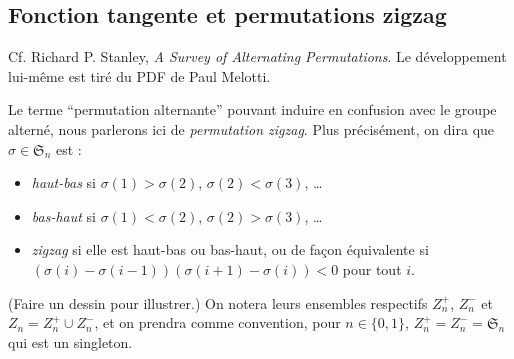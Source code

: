 \documentclass[a4paper, 11pt]{article}
\def\R{\mathbb{R}}
\def\M{\mathcal{M}}
\def\Tr{\textnormal{Tr}}
\def\Sigmap{\mathfrak{S}}
\newtheorem*{theorem}{Théorème}
\begin{document}




\newpage



\subsection{Fonction tangente et permutations zigzag}
\label{zigzag}

Cf. Richard P. Stanley, \emph{A Survey of Alternating Permutations}. Le
développement lui-même est tiré du PDF de Paul Melotti.

Le terme \enquote{permutation alternante} pouvant induire en confusion avec le
groupe alterné, nous parlerons ici de \emph{permutation zigzag}. Plus
précisément, on dira que $\sigma \in \Sigmap_n$ est :
\begin{itemize}
\item \emph{haut-bas} si $\sigma(1) > \sigma(2)$, $\sigma(2) < \sigma(3)$,
  \ldots
\item \emph{bas-haut} si $\sigma(1) < \sigma(2)$, $\sigma(2) > \sigma(3)$,
  \ldots
\item \emph{zigzag} si elle est haut-bas ou bas-haut, ou de façon équivalente si
  $(\sigma(i) - \sigma(i-1))(\sigma(i+1) - \sigma(i)) < 0$ pour tout $i$.
\end{itemize}
(Faire un dessin pour illustrer.) On notera leurs ensembles respectifs $Z_n^+$,
$Z_n^-$ et $Z_n = Z_n^+ \cup Z_n^-$, et on prendra comme convention, pour $n \in
\{0,1\}$, $Z_n^+ = Z_n^- = \Sigmap_n$ qui est un singleton.
\end{document}
